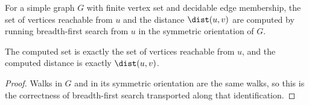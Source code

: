 %
\begin{definition}
  \label{def:reachable-finset}
  \leanok
  For a simple graph $G$ with finite vertex set and decidable edge membership, the set of
  vertices reachable from $u$ and the distance $\dist(u, v)$ are computed by running
  breadth-first search from $u$ in the symmetric orientation of $G$.
\end{definition}

\begin{theorem}[Correctness]
  \label{thm:reachable-finset-correct}
  \leanok
  The computed set is exactly the set of vertices reachable from $u$, and the computed
  distance is exactly $\dist(u, v)$.
\end{theorem}
\begin{proof}
  \leanok
  Walks in $G$ and in its symmetric orientation are the same walks, so this is the
  correctness of breadth-first search transported along that identification.
\end{proof}
